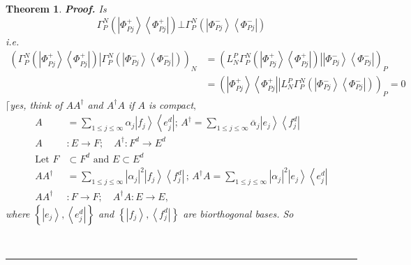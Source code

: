 \documentclass[aps,preprint]{revtex4}%
\newtheorem{theorem}{Theorem}
\newenvironment{proof}[1][Proof]{\noindent\textbf{#1.} }{\ \rule{0.5em}{0.5em}}
\begin{document}
\begin{theorem}
\begin{proof}
Is
\begin{equation}
\Gamma_{P}^{N}\left(  \left\vert \Phi_{Pj}^{+}\right\rangle \left\langle
\Phi_{Pj}^{+}\right\vert \right)  \bot\Gamma_{P}^{N}\left(  \left\vert
\Phi_{Pj}^{-}\right\rangle \left\langle \Phi_{Pj}^{-}\right\vert \right)
\end{equation}
i.e.%
\begin{align}
\left(  \Gamma_{P}^{N}\left(  \left\vert \Phi_{Pj}^{+}\right\rangle
\left\langle \Phi_{Pj}^{+}\right\vert \right)  \left\vert \Gamma_{P}%
^{N}\left(  \left\vert \Phi_{Pj}^{-}\right\rangle \left\langle \Phi_{Pj}%
^{-}\right\vert \right)  \right.  \right)  _{N}  &  =\left(  L_{N}^{P}%
\Gamma_{P}^{N}\left(  \left\vert \Phi_{Pj}^{+}\right\rangle \left\langle
\Phi_{Pj}^{+}\right\vert \right)  \left\vert \left\vert \Phi_{Pj}%
^{-}\right\rangle \left\langle \Phi_{Pj}^{-}\right\vert \right.  \right)
_{P}\\
&  =\left(  \left\vert \Phi_{Pj}^{+}\right\rangle \left\langle \Phi_{Pj}%
^{+}\right\vert \left\vert L_{N}^{P}\Gamma_{P}^{N}\left(  \left\vert \Phi
_{Pj}^{-}\right\rangle \left\langle \Phi_{Pj}^{-}\right\vert \right)  \right.
\right)  _{P}=0
\end{align}
$\lceil$yes, think of $AA^{\dagger}$ and $A^{\dagger}A$ if $A$ is compact$,$%
\begin{align}
A  &  =\sum_{1\leq j\leq\infty}\alpha_{j}\left\vert f_{j}\right\rangle
\left\langle e_{j}^{d}\right\vert ;\,A^{\dagger}=\sum_{1\leq j\leq\infty
}\overline{\alpha}_{j}\left\vert e_{j}\right\rangle \left\langle f_{j}%
^{d}\right\vert \\
A  &  :E\rightarrow F;\quad A^{\dagger}:F^{d}\rightarrow E^{d}\\
\text{Let }F  &  \subset F^{d}\text{ and }E\subset E^{d}\\
AA^{\dagger}  &  =\sum_{1\leq j\leq\infty}\left\vert \alpha_{j}\right\vert
^{2}\left\vert f_{j}\right\rangle \left\langle f_{j}^{d}\right\vert
\,;\,A^{\dagger}A=\sum_{1\leq j\leq\infty}\left\vert \alpha_{j}\right\vert
^{2}\left\vert e_{j}\right\rangle \left\langle e_{j}^{d}\right\vert \\
AA^{\dagger}  &  :F\rightarrow F;\quad A^{\dagger}A:E\rightarrow E,
\end{align}
where $\left\{  \left\vert e_{j}\right\rangle ,\left\langle e_{j}%
^{d}\right\vert \right\}  $ and $\left\{  \left\vert f_{j}\right\rangle
,\left\langle f_{j}^{d}\right\vert \right\}  $ are biorthogonal bases. So

\end{proof}
\end{theorem}
\end{document}
